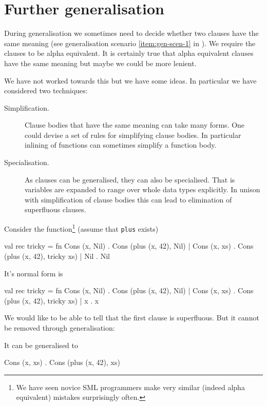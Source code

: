 \section{Further generalisation}
During generalisation we sometimes need to decide whether two clauses have the
same meaning (see generalisation scenario \ref{item:gen-scen-1} in
). We require the clauses to be alpha equivalent. It
is certainly true that alpha equivalent clauses have the same meaning but maybe
we could be more lenient.

We have not worked towards this but we have some ideas. In particular we have
considered two techniques:
\begin{description}
\item[Simplification.] Clause bodies that have the same meaning can take many
  forms. One could devise a set of rules for simplifying clause bodies. In
  particular inlining of functions can sometimes simplify a function body.
\item[Specialisation.] As clauses can be generalised, they can also be
  specialised. That is variables are expanded to range over whole data types
  explicitly. In unison with simplification of clause bodies this can lead to
  elimination of superfluous clauses.
\end{description}

Consider the function\footnote{We have seen novice SML programmers make very
  similar (indeed alpha equivalent) mistakes surprisingly often.} (assume that
\texttt{plus} exists)
\begin{sml}
val rec tricky =
fn Cons (x, Nil) . Cons (plus (x, 42), Nil)
 | Cons (x, xs)  . Cons (plus (x, 42), tricky xs)
 | Nil           . Nil
\end{sml}

It's normal form is

\begin{sml}
val rec tricky =
fn Cons (x, Nil) . Cons (plus (x, 42), Nil)
 | Cons (x, xs)  . Cons (plus (x, 42), tricky xs)
 | x             . x
\end{sml}

We would like to be able to tell that the first clause is superfluous. But it
cannot be removed through generalisation:

It can be generalised to

\begin{sml}
Cons (x, xs) . Cons (plus (x, 42), xs)
\end{sml}

